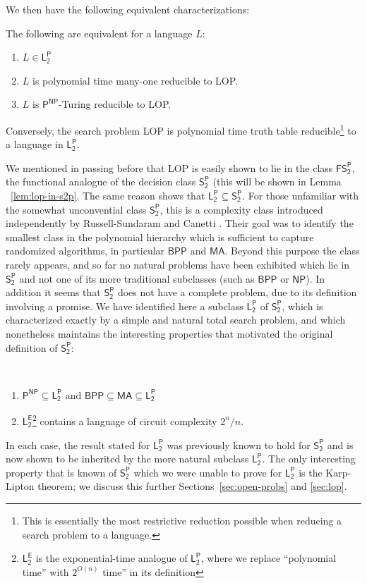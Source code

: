 We then have the following equivalent characterizations:
\begin{theorem}
The following are equivalent for a language $L$:
\begin{enumerate}
    \item $L \in \mathsf{L_2^P}$
    \item $L$ is polynomial time many-one reducible to LOP.
    \item $L$ is $\mathsf{P^{NP}}
$-Turing reducible to LOP.
\end{enumerate}
Conversely, the search problem LOP is polynomial time truth table reducible\footnote{This is essentially the most restrictive reduction possible when reducing a search problem to a language.} to a language in $\mathsf{L_2^P}$.
\end{theorem}
We mentioned in passing before that LOP is easily shown to lie in the class $\mathsf{FS_2^P}$, the functional analogue of the decision class $\mathsf{S_2^P}$ (this will be shown in Lemma ~\ref{lem:lop-in-s2p}. The same reason shows that $\mathsf{L_2^P} \subseteq \mathsf{S_2^P}$. For those unfamiliar with the somewhat unconvential class $\mathsf{S_2^P}$, this is a complexity class introduced independently by Russell-Sundaram and Canetti \cite{russell-sundaram,canetti}. Their goal was to identify the smallest class in the polynomial hierarchy which is sufficient to capture randomized algorithms, in particular $\mathsf{BPP}$ and $\mathsf{MA}$. Beyond this purpose the class rarely appears, and so far no natural problems have been exhibited which lie in $\mathsf{S_2^P}$ and not one of its more traditional subclasses (such as $\mathsf{BPP}$ or $\mathsf{NP}$). In addition it seems that $\mathsf{S_2^P}$ does not have a complete problem, due to its definition involving a promise. We have identified here a subclass $\mathsf{L_2^P}$ of $\mathsf{S_2^P}$, which is characterized exactly by a simple and natural total search problem, and which nonetheless maintains the interesting properties that motivated the original definition of $\mathsf{S_2^P}$:
\begin{theorem}
\phantom\\
\begin{enumerate}
    \item $\mathsf{P^{NP}} \subseteq \mathsf{L_2^P}$ and $\mathsf{BPP} \subseteq \mathsf{MA} \subseteq \mathsf{L_2^P}$
    \item $\mathsf{L_2^E}$\footnote{$\mathsf{L_2^E}$ is the exponential-time analogue of $\mathsf{L_2^P}$, where we replace ``polynomial time'' with $2^{O(n)}$ time'' in its definition} contains a language of circuit complexity $2^n/n$.
\end{enumerate}
\end{theorem}
In each case, the result stated for $\mathsf{L_2^P}$ was previously known to hold for $\mathsf{S_2^P}$ and is now shown to be inherited by the more natural subclass $\mathsf{L_2^P}$. The only interesting property that is known of $\mathsf{S_2^P}$ which we were unable to prove for $\mathsf{L_2^P}$ is the Karp-Lipton theorem; we discuss this further Sections~\ref{sec:open-probs} and \ref{sec:lop}.


